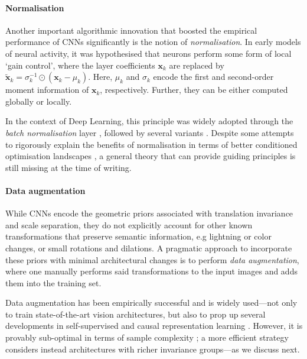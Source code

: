 
\paragraph{Normalisation} 
Another important algorithmic innovation that boosted the empirical performance of CNNs significantly is the notion of \emph{normalisation}. In early models of neural activity, it was hypothesised that neurons perform some form of local `gain control', where the layer coefficients $\mathbf{x}_{k}$ are replaced by $\mathbf{\tilde{x}}_{k} = \sigma_k^{-1} \odot (\mathbf{x}_{k} - \mu_k)$. Here, $\mu_k$ and $\sigma_k$ encode the first and second-order moment information of $\mathbf{x}_k$, respectively. Further, they can be either computed globally or locally.

In the context of Deep Learning, this principle was widely adopted through the \emph{batch normalisation} layer \citep{ioffe2015batch}, followed by several variants \citep{ba2016layer,salimans2016weight,ulyanov2016instance,cooijmans2016recurrent,wu2018group}. 
Despite some attempts to rigorously explain the benefits of normalisation in terms of better conditioned optimisation landscapes \citep{santurkar2018does}, a general theory that can provide guiding principles is still missing at the time of writing.  

\paragraph{Data augmentation}
While CNNs encode the geometric priors associated with translation invariance and scale separation, they do not explicitly account for other known transformations that preserve semantic information, e.g lightning or color changes, or small rotations and dilations. A pragmatic approach to incorporate these priors with minimal architectural changes is to perform \emph{data augmentation}, where one manually performs said transformations to the input images and adds them into the training set.

Data augmentation has been empirically successful and is widely used---not only to train state-of-the-art vision architectures, but also to prop up several developments in self-supervised and causal representation learning \citep{chen2020simple,grill2020bootstrap,mitrovic2020representation}. However, it is provably sub-optimal in terms of sample complexity \citep{mei2021learning}; a more efficient strategy considers instead architectures with richer invariance groups---as we discuss next.

